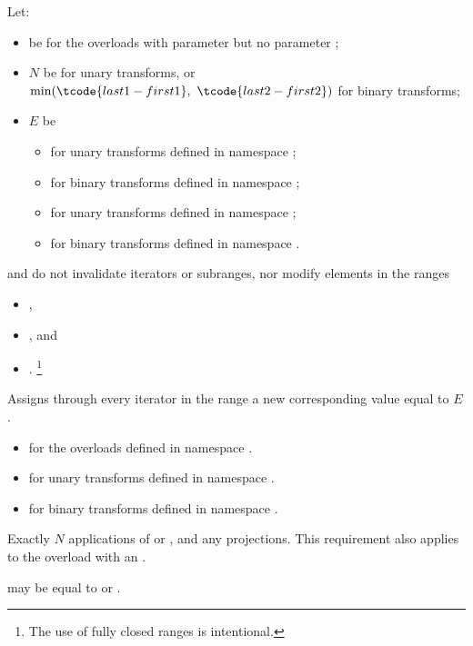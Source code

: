 \begin{itemdescr}
\pnum
Let:
\begin{itemize}
\setlength{\emergencystretch}{1em}
\item
   be 
  for the overloads with parameter 
  but no parameter ;
\item
  $N$ be  for unary transforms, or
  $\min(\tcode{last1 - first1}, \ \tcode{last2 - first2})$ for binary transforms;
\item
  $E$ be
  \begin{itemize}
  \item
    for unary transforms defined in namespace ;
  \item
    for binary transforms defined in namespace ;
  \item
    for unary transforms defined in namespace ;
  \item
    for binary transforms defined in namespace .
  \end{itemize}
\end{itemize}

\pnum
\expects
{} and  do not invalidate iterators or subranges, nor
modify elements in the ranges
\begin{itemize}
\item {},
\item {}, and
\item {}.%
\footnote{The use of fully closed ranges is intentional.}
\end{itemize}

\pnum
\effects
Assigns through every iterator 
in the range 
a new corresponding value equal to $E$.

\pnum
\returns
\begin{itemize}
\item
  for the overloads defined in namespace .
\item
  for unary transforms defined in namespace .
\item
  for binary transforms defined in namespace .
\end{itemize}

\pnum
\complexity
Exactly $N$ applications of  or , and
any projections.
This requirement also applies to the overload with an .

\pnum
\remarks
{} may be equal to  or .
\end{itemdescr}

